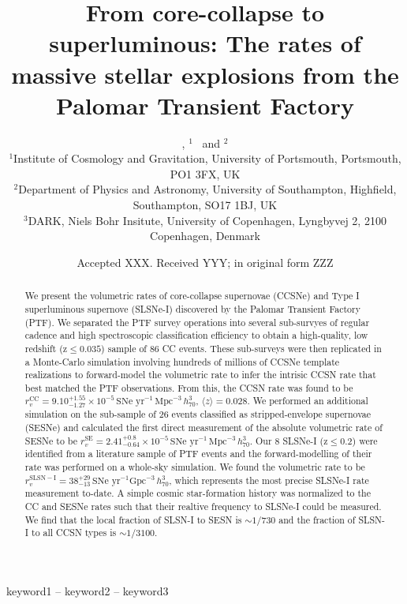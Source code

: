 \documentclass[a4paper,fleqn,usenatbib]{mnras}
\title[The Rates of Core Collapse Events from PTF]{From core-collapse to superluminous: The rates of massive stellar explosions from the Palomar Transient Factory}
\author[C. Frohmaier et al.]{
\chris{C. Frohmaier,$^{1}$\thanks{E-mail: chris.frohmaier@port.ac.uk}}
\angus{C.~R.~Angus,$^{2,3}$}, \maria{M.  Vincenzi}$^{1}$~ and \marksul{M. Sullivan}$^{2}$
\\
$^{1}$Institute of Cosmology and Gravitation, University of Portsmouth, Portsmouth, PO1 3FX, UK\\
$^{2}$Department of Physics and Astronomy, University of Southampton, Highfield, Southampton, SO17 1BJ, UK\\
$^{3}$DARK, Niels Bohr Insitute, University of Copenhagen, Lyngbyvej 2, 2100 Copenhagen, Denmark
}
\date{Accepted XXX. Received YYY; in original form ZZZ}
\begin{document}
\label{firstpage}
\pagerange{\pageref{firstpage}--\pageref{lastpage}}
\maketitle

\begin{abstract}
    We present the volumetric rates of core-collapse supernovae (CCSNe) and Type I superluminous supernove (SLSNe-I) discovered by the Palomar Transient Factory (PTF). We separated the PTF survey operations into several sub-survyes of regular cadence and high spectroscopic classification efficiency to obtain a high-quality, low redshift (z${\le}0.035$) sample of 86 CC events. These sub-surveys were then replicated in a Monte-Carlo simulation involving hundreds of millions of CCSNe template realizations to forward-model the volumetric rate to infer the intrisic CCSN rate that best matched the PTF observations. From this, the CCSN rate was found to be $r^\mathrm{CC}_v=9.10_{-1.27}^{+1.55}\times10^{-5}\,\text{SNe yr}^{-1}\,\text{Mpc}^{-3}\, h_{70}^{3}$, $ \langle z \rangle = 0.028$. We performed an additional simulation on the sub-sample of 26 events classified as stripped-envelope supernovae (SESNe) and calculated the first direct measurement of the absolute volumetric rate of SESNe to be $r^\mathrm{SE}_v=2.41_{-0.64}^{+0.8}\times10^{-5}\, \text{SNe yr}^{-1}\,\text{Mpc}^{-3}\, h_{70}^{3}$. Our 8 SLSNe-I (z${\le}0.2$) were identified from a literature sample of PTF events and the forward-modelling of their rate was performed on a whole-sky simulation. We found the volumetric rate to be $r^\mathrm{SLSN-I}_v=38_{-13}^{+29}\, \text{SNe yr}^{-1}\text{Gpc}^{-3}\, h_{70}^{3}$, which represents the most precise SLSNe-I rate measurement to-date. A simple cosmic star-formation history was normalized to the CC and SESNe rates such that their realtive frequency to SLSNe-I could be measured. We find that the local fraction of SLSN-I to SESN is $\sim1/730$ and the fraction of SLSN-I to all CCSN types is $\sim 1/3100$.
\end{abstract}

\begin{keywords}
keyword1 -- keyword2 -- keyword3
\end{keywords}


\end{document}
